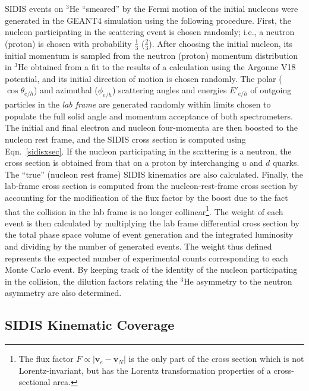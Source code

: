 SIDIS events on $^3$He ``smeared'' by the Fermi motion of the initial nucleons were generated in the GEANT4 simulation using the following procedure. First, the nucleon participating in the scattering event is chosen randomly; i.e., a neutron (proton) is chosen with probability $\frac{1}{3}$ ($\frac{2}{3}$). After choosing the initial nucleon, its initial momentum is sampled from the neutron (proton) momentum distribution in $^3$He obtained from a fit to the results of a calculation using the Argonne V18 potential, and its initial direction of motion is chosen randomly. The polar ($\cos \theta_{e/h}$) and azimuthal ($\phi_{e/h}$) scattering angles and energies $E'_{e/h}$ of outgoing particles in the \emph{lab frame} are generated randomly within limits chosen to populate the full solid angle and momentum acceptance of both spectrometers. The initial and final electron and nucleon four-momenta are then boosted to the nucleon rest frame, and the SIDIS cross section is computed using Eqn.~\eqref{sidisxsec}. If the nucleon participating in the scattering is a neutron, the cross section is obtained from that on a proton by interchanging $u$ and $d$ quarks. The ``true'' (nucleon rest frame) SIDIS kinematics are also calculated. Finally, the lab-frame cross section is computed from the nucleon-rest-frame cross section by accounting for the modification of the flux factor by the boost due to the fact that the collision in the lab frame is no longer collinear\footnote{The flux factor $F \propto \left| \mathbf{v}_e - \mathbf{v}_N\right|$ is the only part of the cross section which is not Lorentz-invariant, but has the Lorentz transformation properties of a cross-sectional area.}. The weight of each event is then calculated by multiplying the lab frame differential cross section by the total phase space volume of event generation and the integrated luminosity and dividing by the number of generated events. The weight thus defined represents the expected number of experimental counts corresponding to each Monte Carlo event. By keeping track of the identity of the nucleon participating in the collision, the dilution factors relating the $^3$He asymmetry to the neutron asymmetry are also determined. 
\subsection{SIDIS Kinematic Coverage}
